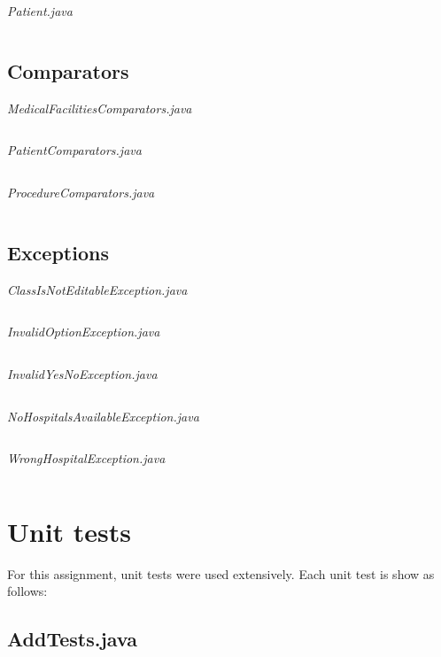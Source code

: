 \documentclass{article}
\begin{document}
	\textit{Patient.java}
	\inputminted{java}{src/main/java/com/yvesstraten/medicalconsole/Patient.java}

	\subsection{Comparators}\label{sub:comparators} %
	\textit{MedicalFacilitiesComparators.java}
	\inputminted{java}{src/main/java/com/yvesstraten/medicalconsole/comparators/MedicalFacilitiesComparators.java}

	\textit{PatientComparators.java}
	\inputminted{java}{src/main/java/com/yvesstraten/medicalconsole/comparators/PatientComparators.java}

	\textit{ProcedureComparators.java}
	\inputminted{java}{src/main/java/com/yvesstraten/medicalconsole/comparators/ProcedureComparators.java}

	\subsection{Exceptions}\label{sub:exceptions} %
	\textit{ClassIsNotEditableException.java}
	\inputminted{java}{src/main/java/com/yvesstraten/medicalconsole/exceptions/ClassIsNotEditableException.java}

	\textit{InvalidOptionException.java}
	\inputminted{java}{src/main/java/com/yvesstraten/medicalconsole/exceptions/InvalidOptionException.java}

	\textit{InvalidYesNoException.java}
	\inputminted{java}{src/main/java/com/yvesstraten/medicalconsole/exceptions/InvalidYesNoException.java}

	\textit{NoHospitalsAvailableException.java}
	\inputminted{java}{src/main/java/com/yvesstraten/medicalconsole/exceptions/NoHospitalsAvailableException.java}

	\textit{WrongHospitalException.java}
	\inputminted{java}{src/main/java/com/yvesstraten/medicalconsole/exceptions/WrongHospitalException.java}

	\section{Unit tests}\label{sec:unit_tests} %
	For this assignment, unit tests were used extensively. Each unit test is show as follows:
	
	\subsection{AddTests.java} 
	\inputminted{java}{src/test/java/com/yvesstraten/medicalconsole/tests/AddTests.java}
\end{document}
